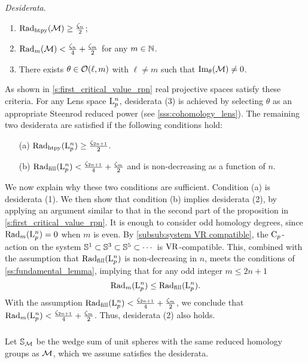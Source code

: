 \medskip\noindent\textit{\darkblue Desiderata}.\
\begin{enumerate}
    \item $\mathrm{Rad}_{\mathrm{htpy}}(\mathcal{M}) \geq \tfrac{\zeta_n}{2} $;
    \item $\mathrm{Rad}_{m}(\mathcal{M}) < \tfrac{\zeta_n}{4}+\tfrac{\zeta_m}{2}$ for any $m \in \mathbb{N}$.
    \item There exists $\theta \in \mathcal{O}(\ell, m)$ with \(\ell \neq m\) such that $\operatorname{Im}_\theta(\mathcal{M}) \neq 0$.
\end{enumerate}

As shown in \cref{s:first_critical_value_rpn} real projective spaces satisfy these criteria. 
For any Lens space $\mathrm{L}^n_p$, 
desiderata (3) is achieved by selecting $\theta$ as an appropriate Steenrod reduced power (see \cref{sss:cohomology_lens}). 
The remaining two desiderata are satisfied if the following conditions hold:
\begin{enumerate}
    \item [(a)] $\mathrm{Rad}_{\mathrm{htpy}}(\mathrm{L}^n_p) \geq \tfrac{\zeta_{2n+1}}{2}$. 
    \item [(b)] $\mathrm{Rad}_{\mathrm{fill}}(\mathrm{L}^n_p) < \tfrac{\zeta_{2n+1}}{4} + \tfrac{\zeta_{m}}{2}$ and is non-decreasing as a function of \(n\).
\end{enumerate}

We now explain why these two conditions are sufficient.
Condition (a) is desiderata (1). 
We then show that condition (b) implies desiderata (2), by applying an argument similar to that in the second part of the proposition in \cref{s:first_critical_value_rpn}.  
It is enough to consider odd homology degrees, since $\mathrm{Rad}_{m}(\mathrm{L}^n_p) = 0$ when $m$ is even.
By \cref{subsub:system VR compatible}, the $\mathrm{C}_p$-action on the system $\mathbb{S}^1 \subset \mathbb{S}^3 \subset \mathbb{S}^5 \subset \dotsb$ is \(\mathrm{VR}\)-compatible.
This, combined with the assumption that $\mathrm{Rad}_{\mathrm{fill}}(\mathrm{L}^n_p)$ is non-decreasing in $n$, meets the conditions of \cref{ss:fundamental_lemma}, implying that for any odd integer $m \leq 2n+1$ 
\[
\mathrm{Rad}_{m}(\mathrm{L}^n_p) \leq \mathrm{Rad}_{\mathrm{fill}}(\mathrm{L}^n_p).
\]
With the assumption $\mathrm{Rad}_{\mathrm{fill}}(\mathrm{L}^n_p) < \tfrac{\zeta_{2n+1}}{4} + \tfrac{\zeta_{m}}{2}$, we conclude that $\mathrm{Rad}_{m}(\mathrm{L}^n_p) < \tfrac{\zeta_{2n+1}}{4} + \tfrac{\zeta_{m}}{2}$.
Thus, desiderata (2) also holds.

\subsubsection{}

Let $\mathbb{S}_{\mathcal{M}}$ be the wedge sum of unit spheres with the same reduced homology groups as $\mathcal{M}$, which we assume satisfies the desiderata.

